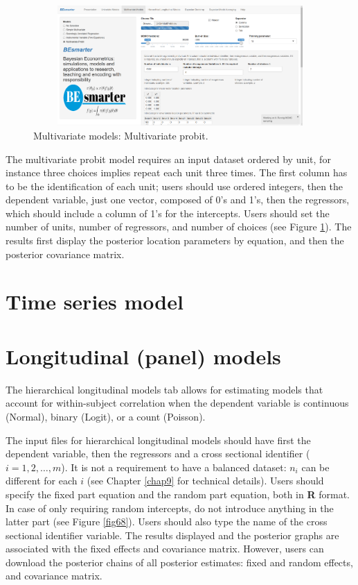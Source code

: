 \begin{figure}
	\includegraphics[width=340pt, height=130pt]{Chapters/chapterGUI/figures/Figure7.png}
	\caption[List of figure caption goes here]{Multivariate models: Multivariate probit.}\label{fig67}
\end{figure} 

The multivariate probit model requires an input dataset ordered by unit, for instance three choices implies repeat each unit three times. The first column has to be the identification of each unit; users should use ordered integers, then the dependent variable, just one vector, composed of 0's and 1's, then the regressors, which should include a column of 1's for the intercepts. Users should set the number of units, number of regressors, and number of choices (see Figure \ref{fig67}). The results first display the posterior location parameters by equation, and then the posterior covariance matrix.

\section{Time series model}\label{secGUI4}

\section{Longitudinal (panel) models}\label{secGUI5}
The hierarchical longitudinal models tab allows for estimating models that account for within-subject correlation when the dependent variable is continuous (Normal), binary (Logit), or a count (Poisson).

The input files for hierarchical longitudinal models should have first the dependent variable, then the regressors and a cross sectional identifier ($i=1,2,\dots,m$). It is not a requirement to have a balanced dataset: $n_i$ can be different for each $i$ (see Chapter \ref{chap9} for technical details). Users should specify the fixed part equation and the random part equation,
both in \textbf{R} format. In case of only requiring random intercepts, do not introduce anything in the latter part (see Figure \ref{fig68}). Users should also type the name of the cross sectional identifier variable. The results displayed and the posterior graphs are associated with the fixed effects and covariance matrix. However, users can download the posterior chains of all posterior estimates: fixed and random effects, and covariance matrix.

